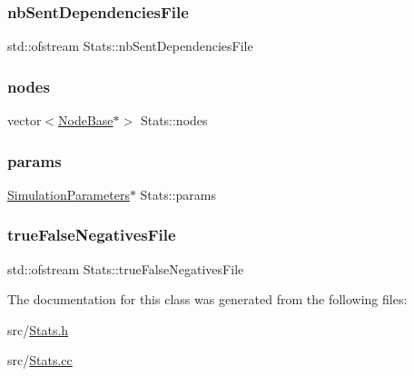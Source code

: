\mbox{\label{class_stats_a26404a5110226c52970e3c261c6d8126}} 
\subsubsection{\texorpdfstring{nb\+Sent\+Dependencies\+File}{nbSentDependenciesFile}}
{\footnotesize\ttfamily std\+::ofstream Stats\+::nb\+Sent\+Dependencies\+File\hspace{0.3cm}{\ttfamily [private]}}

\mbox{\label{class_stats_a815a3aa12c1529fe3d686038a2094fb2}} 
\subsubsection{\texorpdfstring{nodes}{nodes}}
{\footnotesize\ttfamily vector$<$\hyperlink{class_node_base}{Node\+Base}$\ast$$>$ Stats\+::nodes\hspace{0.3cm}{\ttfamily [private]}}

\mbox{\label{class_stats_aec7570f722a5a0c6ed5f6b7208331dc1}} 
\subsubsection{\texorpdfstring{params}{params}}
{\footnotesize\ttfamily \hyperlink{class_simulation_parameters}{Simulation\+Parameters}$\ast$ Stats\+::params\hspace{0.3cm}{\ttfamily [private]}}

\mbox{\label{class_stats_ac9e180c84874fabd361396f3c9a166ae}} 
\subsubsection{\texorpdfstring{true\+False\+Negatives\+File}{trueFalseNegativesFile}}
{\footnotesize\ttfamily std\+::ofstream Stats\+::true\+False\+Negatives\+File\hspace{0.3cm}{\ttfamily [private]}}



The documentation for this class was generated from the following files\+:\begin{DoxyCompactItemize}
\item 
src/\hyperlink{_stats_8h}{Stats.\+h}\item 
src/\hyperlink{_stats_8cc}{Stats.\+cc}\end{DoxyCompactItemize}
